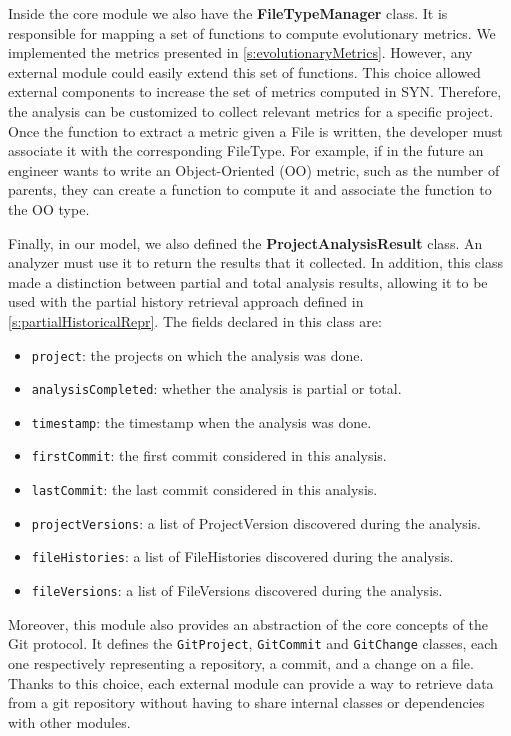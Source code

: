Inside the core module we also have the \textbf{FileTypeManager} class. It is responsible for mapping a set of functions to compute evolutionary metrics. We implemented the metrics presented in \autoref{s:evolutionaryMetrics}. However, any external module could easily extend this set of functions. This choice allowed external components to increase the set of metrics computed in SYN. Therefore, the analysis can be customized to collect relevant metrics for a specific project. Once the function to extract a metric given a File is written, the developer must associate it with the corresponding FileType. For example, if in the future an engineer wants to write an  Object-Oriented (OO) metric, such as the number of parents, they can create a function to compute it and associate the function to the OO type.
\bigbreak

Finally, in our model, we also defined the \textbf{ProjectAnalysisResult} class. An analyzer must use it to return the results that it collected. In addition, this class made a distinction between partial and total analysis results, allowing it to be used with the partial history retrieval approach defined in \autoref{s:partialHistoricalRepr}. The fields declared in this class are:
\begin{itemize}
    \item \texttt{project}: the projects on which the analysis was done.
    \item \texttt{analysisCompleted}: whether the analysis is partial or total.
    \item \texttt{timestamp}: the timestamp when the analysis was done. 
    \item \texttt{firstCommit}: the first commit considered in this analysis. 
    \item \texttt{lastCommit}: the last commit considered in this analysis. 
    \item \texttt{projectVersions}: a list of ProjectVersion discovered during the analysis.
    \item \texttt{fileHistories}: a list of FileHistories discovered during the analysis.
    \item \texttt{fileVersions}: a list of FileVersions discovered during the analysis.
\end{itemize}

Moreover, this module also provides an abstraction of the core concepts of the Git protocol. It defines the \texttt{GitProject}, \texttt{GitCommit} and \texttt{GitChange} classes, each one respectively representing a repository, a commit, and a change on a file. 
Thanks to this choice, each external module can provide a way to retrieve data from a git repository without having to share internal classes or dependencies with other modules. 


